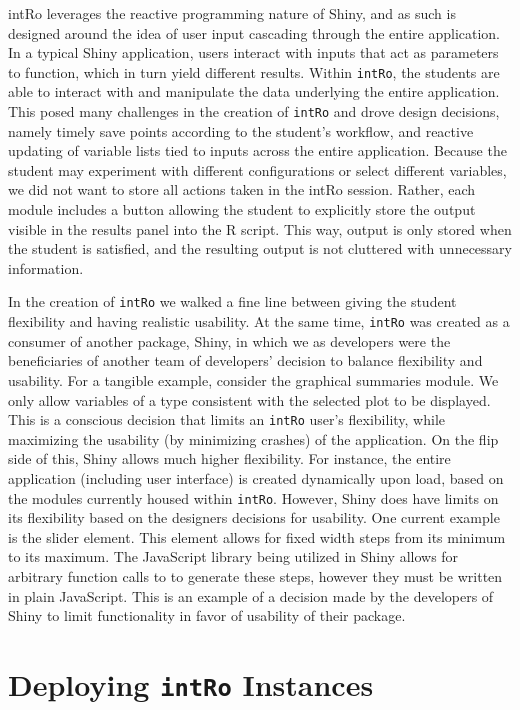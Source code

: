 \documentclass[12pt,]{article}
\begin{document}
intRo leverages the reactive programming nature of Shiny, and as such is
designed around the idea of user input cascading through the entire
application. In a typical Shiny application, users interact with inputs
that act as parameters to function, which in turn yield different
results. Within \texttt{intRo}, the students are able to interact with
and manipulate the data underlying the entire application. This posed
many challenges in the creation of \texttt{intRo} and drove design
decisions, namely timely save points according to the student's
workflow, and reactive updating of variable lists tied to inputs across
the entire application. Because the student may experiment with
different configurations or select different variables, we did not want
to store all actions taken in the intRo session. Rather, each module
includes a button allowing the student to explicitly store the output
visible in the results panel into the R script. This way, output is only
stored when the student is satisfied, and the resulting output is not
cluttered with unnecessary information.

In the creation of \texttt{intRo} we walked a fine line between giving
the student flexibility and having realistic usability. At the same
time, \texttt{intRo} was created as a consumer of another package,
Shiny, in which we as developers were the beneficiaries of another team
of developers' decision to balance flexibility and usability. For a
tangible example, consider the graphical summaries module. We only allow
variables of a type consistent with the selected plot to be displayed.
This is a conscious decision that limits an \texttt{intRo} user's
flexibility, while maximizing the usability (by minimizing crashes) of
the application. On the flip side of this, Shiny allows much higher
flexibility. For instance, the entire application (including user
interface) is created dynamically upon load, based on the modules
currently housed within \texttt{intRo}. However, Shiny does have limits
on its flexibility based on the designers decisions for usability. One
current example is the slider element. This element allows for fixed
width steps from its minimum to its maximum. The JavaScript library
being utilized in Shiny allows for arbitrary function calls to to
generate these steps, however they must be written in plain JavaScript.
This is an example of a decision made by the developers of Shiny to
limit functionality in favor of usability of their package.

\section{\texorpdfstring{Deploying \texttt{intRo}
Instances}{Deploying intRo Instances}}\label{deploying-intro-instances}
\end{document}

